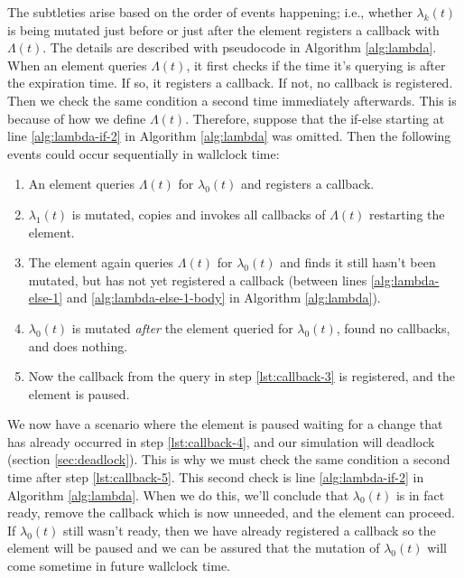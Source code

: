 \begin{bibunit}[unsrtnat]
The subtleties arise based on the order of events happening; i.e., whether
$\lambda_k(t)$ is being mutated just before or just after the element registers
a callback with $\Lambda(t)$. The details are described with pseudocode in
Algorithm \ref{alg:lambda}. When an element queries $\Lambda(t)$, it first
checks if the time it's querying is after the expiration time. If so, it
registers a callback. If not, no callback is registered. Then we check the same
condition a second time immediately afterwards. This is because of how we define
$\Lambda(t)$. Therefore, suppose that the if-else starting at line
\ref{alg:lambda-if-2} in Algorithm \ref{alg:lambda} was omitted.  Then the
following events could occur sequentially in wallclock time:
\begin{enumerate}
  \item An element queries $\Lambda(t)$ for $\lambda_0(t)$ and registers a
  callback.
  \item $\lambda_1(t)$ is mutated, copies and invokes all callbacks of
  $\Lambda(t)$ restarting the element.
  \item\label{lst:callback-3} The element again queries $\Lambda(t)$ for
  $\lambda_0(t)$ and finds it still hasn't been mutated, but has not yet
  registered a callback (between lines \ref{alg:lambda-else-1} and
  \ref{alg:lambda-else-1-body} in Algorithm \ref{alg:lambda}).
  \item\label{lst:callback-4} $\lambda_0(t)$ is mutated \textit{after} the
  element queried for $\lambda_0(t)$, found no callbacks, and does nothing.
  \item\label{lst:callback-5} Now the callback from the query in step
  \ref{lst:callback-3} is registered, and the element is paused.
\end{enumerate}
We now have a scenario where the element is paused waiting for a change that has
already occurred in step \ref{lst:callback-4}, and our simulation will deadlock
(section \ref{sec:deadlock}). This is why we must check the same condition a
second time after step \ref{lst:callback-5}. This second check is line
\ref{alg:lambda-if-2} in Algorithm \ref{alg:lambda}. When we do this, we'll
conclude that $\lambda_0(t)$ is in fact ready, remove the callback which is now
unneeded, and the element can proceed. If $\lambda_0(t)$ still wasn't ready,
then we have already registered a callback so the element will be paused and we
can be assured that the mutation of $\lambda_0(t)$ will come sometime in future
wallclock time.


\end{bibunit}
